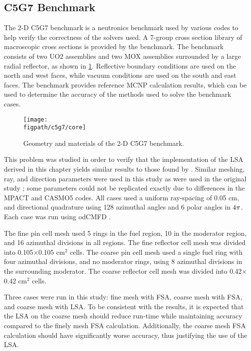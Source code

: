{{    \subsection{C5G7 Benchmark}{\label{ssec:LSMOC:C5G7 Benchmark}
      The 2-D C5G7 benchmark \cite{Smith2006} is a neutronics benchmark used by various codes to help verify the correctness of the solvers used.
      A 7-group cross section library of macroscopic cross sections is provided by the benchmark.
      The benchmark consists of two \ac{UO2} assemblies and two \ac{MOX} assemblies surrounded by a large radial reflector, as shown in \cref{fig:LSMOC:C5G7:CoreGeom}.
      Reflective boundary conditions are used on the north and west faces, while vacuum conditions are used on the south and east faces.
      The benchmark provides reference MCNP calculation results, which can be used to determine the accuracy of the methods used to solve the benchmark cases.

      \begin{figure}[htbp]
        \centering
        \texttt{[image: \\figpath/c5g7/core]}
        \caption{Geometry and materials of the 2-D C5G7 benchmark. \label{fig:LSMOC:C5G7:CoreGeom}}
      \end{figure}

      This problem was studied in order to verify that the implementation of the \ac{LSA} derived in this chapter yields similar results to those found by \citet{Ferrer2016}.
      Similar meshing, ray, and direction parameters were used in this study as were used in the original study \cite{Ferrer2016}; some parameters could not be replicated exactly due to differences in the MPACT and CASMO5 codes.
      All cases used a uniform ray-spacing of 0.05 cm, and directional quadrature using 128 azimuthal angles and 6 polar angles in $4\pi$.
      Each case was run using od\ac{CMFD} \cite{Zhu2016}.

      The fine pin cell mesh used 5 rings in the fuel region, 10 in the moderator region, and 16 azimuthal divisions in all regions.
      The fine reflector cell mesh was divided into 0.105$\times$0.105 cm$^2$ cells.
      The coarse pin cell mesh used a single fuel ring with four azimuthal divisions, and no moderator rings, using 8 azimuthal divisions in the surrounding moderator.
      The coarse reflector cell mesh was divided into 0.42$\times$0.42 cm$^2$ cells.

      Three cases were run in this study: fine mesh with \ac{FSA}, coarse mesh with \ac{FSA}, and coarse mesh with \ac{LSA}.
      To be consistent with the \citet{Ferrer2016} results, it is expected that the \ac{LSA} on the coarse mesh should reduce run-time while maintaining accuracy compared to the finely mesh \ac{FSA} calculation.
      Additionally, the coarse mesh \ac{FSA} calculation should have significantly worse accuracy, thus justifying the use of the \ac{LSA}.

}}}
